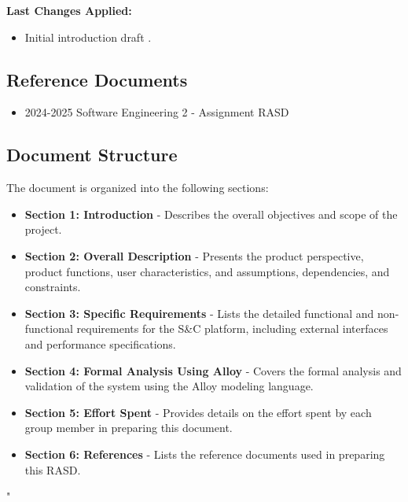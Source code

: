 \textbf{Last Changes Applied:}

\begin{itemize}
        \item Initial introduction draft . 
\end{itemize}

\subsection{Reference Documents}
\begin{itemize}
    \item 2024-2025 Software Engineering 2 - Assignment RASD
\end{itemize}

\subsection{Document Structure}
The document is organized into the following sections:
\begin{itemize}
    \item \textbf{Section 1: Introduction} - Describes the overall objectives and scope of the project.
    \item \textbf{Section 2: Overall Description} - Presents the product perspective, product functions, user characteristics, and assumptions, dependencies, and constraints.
    \item \textbf{Section 3: Specific Requirements} - Lists the detailed functional and non-functional requirements for the S\&C platform, including external interfaces and performance specifications.
    \item \textbf{Section 4: Formal Analysis Using Alloy} - Covers the formal analysis and validation of the system using the Alloy modeling language.
    \item \textbf{Section 5: Effort Spent} - Provides details on the effort spent by each group member in preparing this document.
    \item \textbf{Section 6: References} - Lists the reference documents used in preparing this RASD.
\end{itemize}

\newpage
" 
